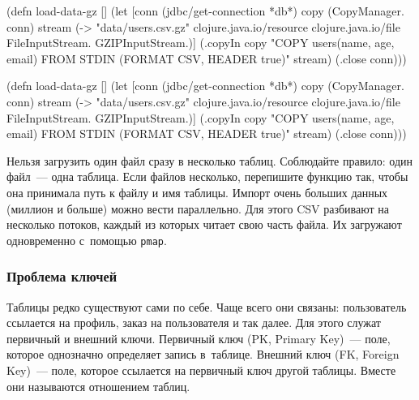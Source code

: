 
\ifnarrow

\begin{english}
  \begin{clojure/lines}
(defn load-data-gz []
  (let [conn
        (jdbc/get-connection *db*)
        copy (CopyManager. conn)
        stream
        (-> "data/users.csv.gz"
            clojure.java.io/resource
            clojure.java.io/file
            FileInputStream.
            GZIPInputStream.)]
   (.copyIn copy
     "COPY users(name, age, email)
      FROM STDIN
      (FORMAT CSV, HEADER true)"
     stream)
   (.close conn)))
  \end{clojure/lines}
\end{english}

\else

\begin{english}
  \begin{clojure/lines}
(defn load-data-gz []
  (let [conn (jdbc/get-connection *db*)
        copy (CopyManager. conn)
        stream (-> "data/users.csv.gz"
                   clojure.java.io/resource
                   clojure.java.io/file
                   FileInputStream.
                   GZIPInputStream.)]
    (.copyIn copy "COPY users(name, age, email)
             FROM STDIN (FORMAT CSV, HEADER true)"
             stream)
    (.close conn)))
  \end{clojure/lines}
\end{english}

\fi

Нельзя загрузить один файл сразу в несколько таблиц. Соблюдайте правило: один
файл~--- одна таблица. Если файлов несколько, перепишите функцию так, чтобы она
принимала путь к файлу и имя таблицы. Импорт очень больших данных (миллион и
больше) можно вести параллельно. Для этого CSV разбивают на несколько потоков,
каждый из которых читает свою часть файла. Их загружают одновременно с~помощью
\verb|pmap|.

\subsubsection*{Проблема ключей}



Таблицы редко существуют сами по себе. Чаще всего они связаны: пользователь
ссылается на профиль, заказ на пользователя и так далее. Для этого служат
первичный и внешний ключи. Первичный ключ (PK, Primary Key)~--- поле, которое
однозначно определяет запись в~таблице. Внешний ключ (FK, Foreign Key)~--- поле,
которое ссылается на первичный ключ другой таблицы. Вместе они называются
отношением таблиц.

